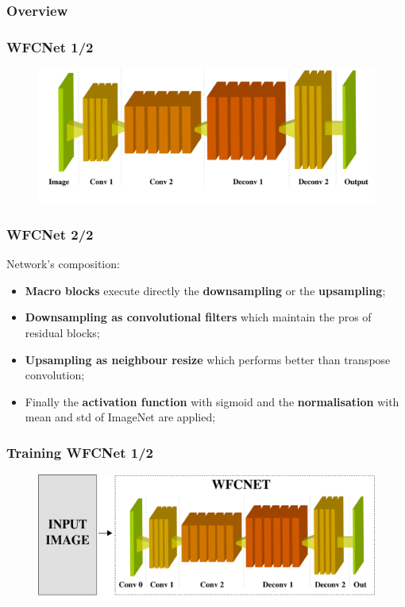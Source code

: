 \documentclass{beamer}
\begin{document}
\begin{frame}
\frametitle{Overview} 
	\tableofcontents[currentsection]
\end{frame}

\begin{frame}
\frametitle{WFCNet 1/2}

\begin{figure}
\includegraphics[width=\textwidth]{../schemi/colorization_img}
\end{figure}
 
\end{frame}

\begin{frame}
\frametitle{WFCNet 2/2}

Network's composition:
\begin{itemize}
\item \textbf{Macro blocks} execute directly the \textbf{downsampling} or the \textbf{upsampling};
\item \textbf{Downsampling as convolutional filters} which maintain the pros of residual blocks;
\item \textbf{Upsampling as neighbour resize} which performs better than transpose convolution;
\item Finally the \textbf{activation function} with sigmoid and the \textbf{normalisation} with mean and std of ImageNet are applied;
\end{itemize}
 
\end{frame}

\begin{frame}
\frametitle{Training WFCNet 1/2}

\begin{figure}
\centering
\includegraphics[height=0.40\textheight]{../schemi/training_WFC1}
\end{figure}
 
\end{frame}
\end{document}
